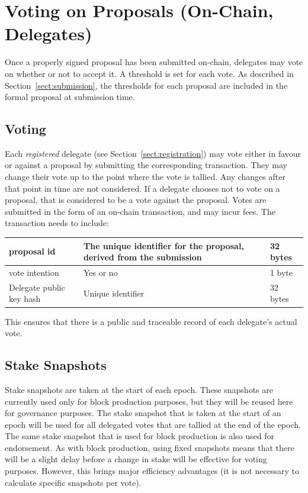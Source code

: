 \newpage
\section{Voting on Proposals (On-Chain, Delegates)}
\label{sect:voting}

Once a properly signed proposal has been submitted on-chain, delegates may vote on whether or not to accept it.  A threshold is set for each vote.
As described in Section~\ref{sect:submission}, the thresholds for each proposal are included in the formal proposal at submission time.

\subsection{Voting}

Each \emph{registered} delegate (see Section~\ref{sect:registration}) may vote either in favour or against a proposal by submitting the corresponding transaction.  They may change their vote up to the point
where the vote is tallied.  Any changes after that point in time are not considered.  If a delegate chooses not to vote on a proposal, that is considered to be
a vote against the proposal.  Votes are submitted in the form of an on-chain transaction, and may incur fees.  The transaction needs to include:

\begin{center}
\begin{tabular}{||l|p{3in}|l||}
  \hline\hline
  proposal id & The unique identifier for the proposal, derived from the submission & 32 bytes
  \\\hline
  vote intention & Yes or no & 1 byte
  \\\hline
  Delegate public key hash & Unique identifier & 32 bytes
  \\\hline
  \hline
\end{tabular}
\end{center}

This ensures that there is a public and traceable record of each delegate's actual vote.


\subsection{Stake Snapshots}

Stake snapshots are taken at the start of each epoch.  These snapshots are currently used only for block production purposes, but they will be reused here for governance purposes.
The stake snapshot that is taken at the start of an epoch will be used for all delegated votes that are tallied at the end of the epoch.
The same stake snapshot that is used for block production is also used for endorsement.
As with block production, using fixed snapshots means that there will be a
slight delay before a change in stake will be effective for voting purposes.
However, this brings major efficiency advantages (it is not necessary to calculate specific snapshots per vote).

